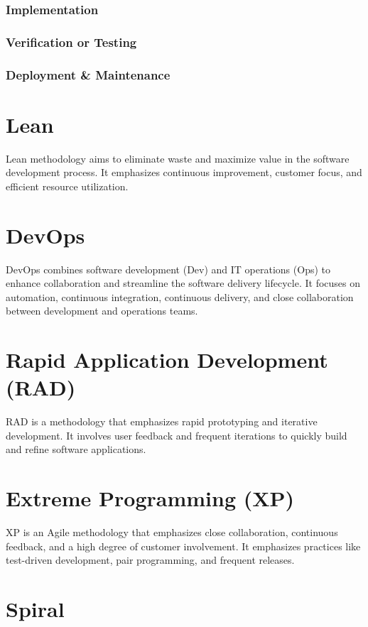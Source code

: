 \subsubsection{Implementation}
\subsubsection{Verification or Testing}
\subsubsection{Deployment \& Maintenance}

\section{Lean}

Lean methodology aims to eliminate waste and maximize value in the software development process. It emphasizes continuous improvement, customer focus, and efficient resource utilization.

\section{DevOps}

DevOps combines software development (Dev) and IT operations (Ops) to enhance collaboration and streamline the software delivery lifecycle. It focuses on automation, continuous integration, continuous delivery, and close collaboration between development and operations teams.

\section{Rapid Application Development (RAD)}

RAD is a methodology that emphasizes rapid prototyping and iterative development. It involves user feedback and frequent iterations to quickly build and refine software applications.

\section{Extreme Programming (XP)}

XP is an Agile methodology that emphasizes close collaboration, continuous feedback, and a high degree of customer involvement. It emphasizes practices like test-driven development, pair programming, and frequent releases.

\section{Spiral}


